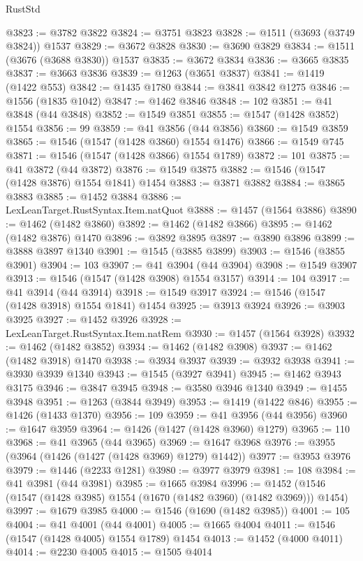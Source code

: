 \begin{lexlean}{RustStd}
\begin{coremodule}
@3823 := @3782 @3822
@3824 := @3751 @3823
@3828 := @1511 (@3693 (@3749 @3824)) @1537
@3829 := @3672 @3828
@3830 := @3690 @3829
@3834 := @1511 (@3676 (@3688 @3830)) @1537
@3835 := @3672 @3834
@3836 := @3665 @3835
@3837 := @3663 @3836
@3839 := @1263 (@3651 @3837)
@3841 := @1419 (@1422 @553)
@3842 := @1435 @1780
@3844 := @3841 @3842 @1275
@3846 := @1556 (@1835 @1042)
@3847 := @1462 @3846
@3848 := 102
@3851 := @41 @3848 (@44 @3848)
@3852 := @1549 @3851
@3855 := @1547 (@1428 @3852) @1554
@3856 := 99
@3859 := @41 @3856 (@44 @3856)
@3860 := @1549 @3859
@3865 := @1546 (@1547 (@1428 @3860) @1554 @1476)
@3866 := @1549 @745
@3871 := @1546 (@1547 (@1428 @3866) @1554 @1789)
@3872 := 101
@3875 := @41 @3872 (@44 @3872)
@3876 := @1549 @3875
@3882 := @1546 (@1547 (@1428 @3876) @1554 @1841) @1454
@3883 := @3871 @3882
@3884 := @3865 @3883
@3885 := @1452 @3884
@3886 := LexLeanTarget.RustSyntax.Item.natQuot
@3888 := @1457 (@1564 @3886)
@3890 := @1462 (@1482 @3860)
@3892 := @1462 (@1482 @3866)
@3895 := @1462 (@1482 @3876) @1470
@3896 := @3892 @3895
@3897 := @3890 @3896
@3899 := @3888 @3897 @1340
@3901 := @1545 (@3885 @3899)
@3903 := @1546 (@3855 @3901)
@3904 := 103
@3907 := @41 @3904 (@44 @3904)
@3908 := @1549 @3907
@3913 := @1546 (@1547 (@1428 @3908) @1554 @3157)
@3914 := 104
@3917 := @41 @3914 (@44 @3914)
@3918 := @1549 @3917
@3924 := @1546 (@1547 (@1428 @3918) @1554 @1841) @1454
@3925 := @3913 @3924
@3926 := @3903 @3925
@3927 := @1452 @3926
@3928 := LexLeanTarget.RustSyntax.Item.natRem
@3930 := @1457 (@1564 @3928)
@3932 := @1462 (@1482 @3852)
@3934 := @1462 (@1482 @3908)
@3937 := @1462 (@1482 @3918) @1470
@3938 := @3934 @3937
@3939 := @3932 @3938
@3941 := @3930 @3939 @1340
@3943 := @1545 (@3927 @3941)
@3945 := @1462 @3943 @3175
@3946 := @3847 @3945
@3948 := @3580 @3946 @1340
@3949 := @1455 @3948
@3951 := @1263 (@3844 @3949)
@3953 := @1419 (@1422 @846)
@3955 := @1426 (@1433 @1370)
@3956 := 109
@3959 := @41 @3956 (@44 @3956)
@3960 := @1647 @3959
@3964 := @1426 (@1427 (@1428 @3960) @1279)
@3965 := 110
@3968 := @41 @3965 (@44 @3965)
@3969 := @1647 @3968
@3976 := @3955 (@3964 (@1426 (@1427 (@1428 @3969) @1279) @1442))
@3977 := @3953 @3976
@3979 := @1446 (@2233 @1281)
@3980 := @3977 @3979
@3981 := 108
@3984 := @41 @3981 (@44 @3981)
@3985 := @1665 @3984
@3996 := @1452 (@1546 (@1547 (@1428 @3985) @1554 (@1670 (@1482 @3960) (@1482 @3969))) @1454)
@3997 := @1679 @3985
@4000 := @1546 (@1690 (@1482 @3985))
@4001 := 105
@4004 := @41 @4001 (@44 @4001)
@4005 := @1665 @4004
@4011 := @1546 (@1547 (@1428 @4005) @1554 @1789) @1454
@4013 := @1452 (@4000 @4011)
@4014 := @2230 @4005
@4015 := @1505 @4014

\end{coremodule}
\end{lexlean}
